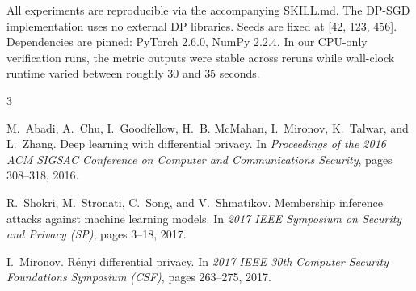 \documentclass[11pt,a4paper]{article}
\begin{document}
All experiments are reproducible via the accompanying SKILL.md. The DP-SGD implementation uses no external DP libraries. Seeds are fixed at [42, 123, 456]. Dependencies are pinned: PyTorch 2.6.0, NumPy 2.2.4. In our CPU-only verification runs, the metric outputs were stable across reruns while wall-clock runtime varied between roughly 30 and 35 seconds.


\begin{thebibliography}{3}

M.~Abadi, A.~Chu, I.~Goodfellow, H.~B. McMahan, I.~Mironov, K.~Talwar, and L.~Zhang.
\newblock Deep learning with differential privacy.
\newblock In \emph{Proceedings of the 2016 ACM SIGSAC Conference on Computer and Communications Security}, pages 308--318, 2016.

R.~Shokri, M.~Stronati, C.~Song, and V.~Shmatikov.
\newblock Membership inference attacks against machine learning models.
\newblock In \emph{2017 IEEE Symposium on Security and Privacy (SP)}, pages 3--18, 2017.

I.~Mironov.
\newblock R\'{e}nyi differential privacy.
\newblock In \emph{2017 IEEE 30th Computer Security Foundations Symposium (CSF)}, pages 263--275, 2017.

\end{thebibliography}
\end{document}
